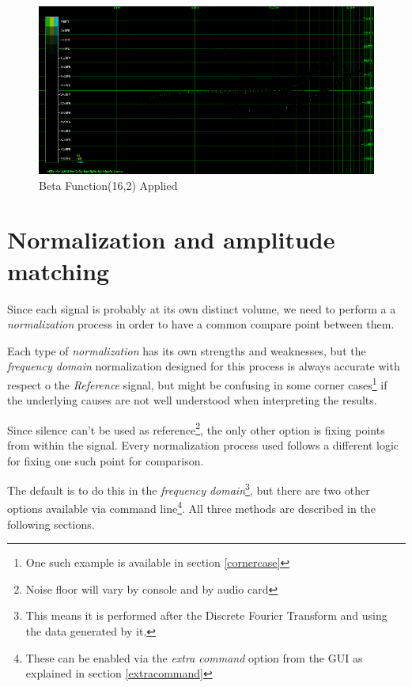 \documentclass[10pt,a4paper]{report}
\begin{document}
\begin{appendices}
\begin{figure}[H]
	\centering
	\includegraphics[width=1\linewidth]{plots/BetaFunctionPlot_5_Data.png}
	\caption[Beta Function(16,2)]{Beta Function(16,2) Applied}
	\label{fig:betafunctionplot5data}
\end{figure}

\chapter{Normalization and amplitude matching}
\label{normalization}

Since each signal is probably at its own distinct volume, we need to perform a a \textit{normalization} process in order to have a common compare point between them.

Each type of \textit{normalization} has its own strengths and weaknesses, but the \textit{frequency domain} normalization designed for this process is always accurate with respect o the \textit{Reference} signal, but might be confusing in some corner cases\footnote{One such example is available in section \ref{cornercase}} if the underlying causes are not well understood when interpreting the results.

Since silence can't be used as reference\footnote{Noise floor will vary by console and by audio card}, the only other option is fixing points from within the signal. Every normalization process used follows a different logic for fixing one such point for comparison.

The default is to do this in the \textit{frequency domain}\footnote{This means it is performed after the Discrete Fourier Transform and using the data generated by it.}, but there are two other options available via command line\footnote{These can be enabled via the \textit{extra command} option from the GUI as explained in section \ref{extracommand}}. All three methods are described in the following sections.


\end{appendices}
\end{document}
